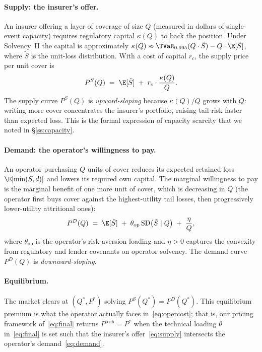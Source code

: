 \paragraph{Supply: the insurer's offer.} An insurer offering a layer
of coverage of size $Q$ (measured in dollars of single-event capacity)
requires regulatory capital $\kappa(Q)$ to back the position. Under
Solvency~II the capital is approximately
$\kappa(Q)\approx\TVaR_{0.995}(Q\cdot \tilde S) - Q\cdot\E[\tilde S]$,
where $\tilde S$ is the unit-loss distribution. With a cost of capital
$r_c$, the supply price per unit cover is
\begin{equation}\label{eq:supply}
   P^S(Q) \;=\; \E[\tilde S]
   \;+\; r_c\cdot\frac{\kappa(Q)}{Q}.
\end{equation}
The supply curve $P^S(Q)$ is \emph{upward-sloping} because
$\kappa(Q)/Q$ grows with $Q$: writing more cover concentrates the
insurer's portfolio, raising tail risk faster than expected loss.
This is the formal expression of capacity scarcity that we noted in
\S\ref{ss:capacity}.

\paragraph{Demand: the operator's willingness to pay.} An operator
purchasing $Q$ units of cover reduces its expected retained loss
$\E[\min(S,d)]$ and lowers its required own capital. The marginal
willingness to pay is the marginal benefit of one more unit of cover,
which is decreasing in $Q$ (the operator first buys cover against
the highest-utility tail losses, then progressively lower-utility
attritional ones):
\begin{equation}\label{eq:demand}
   P^D(Q) \;=\; \E[\tilde S]
   \;+\; \theta_{\mathrm{op}}\,\mathrm{SD}\bigl(\tilde S \mid Q\bigr)
   \;+\; \frac{\eta}{Q},
\end{equation}
where $\theta_{\mathrm{op}}$ is the operator's risk-aversion loading
and $\eta>0$ captures the convexity from regulatory and lender
covenants on operator solvency. The demand curve $P^D(Q)$ is
\emph{downward-sloping}.

\paragraph{Equilibrium.} The market clears at $(Q^*,P^*)$ solving
$P^S(Q^*)=P^D(Q^*)$. This equilibrium premium is what the operator
actually faces in~\eqref{eq:opercost}; that is, our pricing framework
of~\eqref{eq:final} returns $P^{\mathrm{tech}}=P^*$ when the technical
loading $\theta$ in~\eqref{eq:final} is set such that the insurer's
offer~\eqref{eq:supply} intersects the operator's
demand~\eqref{eq:demand}.

